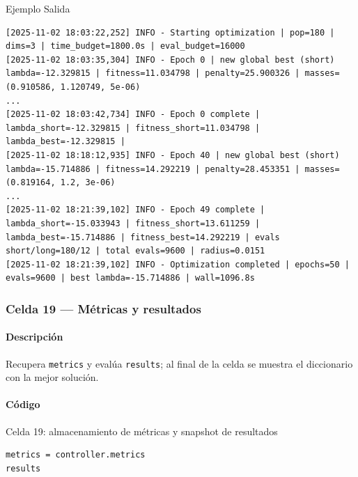 \begin{listing}[H]
\caption{Ejemplo Salida}
\begin{adjustbox}{max width=0.7\textwidth}
\begin{minipage}{\textwidth}
\begin{verbatim}
[2025-11-02 18:03:22,252] INFO - Starting optimization | pop=180 | dims=3 | time_budget=1800.0s | eval_budget=16000
[2025-11-02 18:03:35,304] INFO - Epoch 0 | new global best (short) lambda=-12.329815 | fitness=11.034798 | penalty=25.900326 | masses=(0.910586, 1.120749, 5e-06)
...
[2025-11-02 18:03:42,734] INFO - Epoch 0 complete | lambda_short=-12.329815 | fitness_short=11.034798 | lambda_best=-12.329815 |
[2025-11-02 18:18:12,935] INFO - Epoch 40 | new global best (short) lambda=-15.714886 | fitness=14.292219 | penalty=28.453351 | masses=(0.819164, 1.2, 3e-06)
...
[2025-11-02 18:21:39,102] INFO - Epoch 49 complete | lambda_short=-15.033943 | fitness_short=13.611259 | lambda_best=-15.714886 | fitness_best=14.292219 | evals short/long=180/12 | total evals=9600 | radius=0.0151
[2025-11-02 18:21:39,102] INFO - Optimization completed | epochs=50 | evals=9600 | best lambda=-15.714886 | wall=1096.8s
\end{verbatim}
\end{minipage}
\end{adjustbox}
\end{listing}

\subsubsection*{Celda 19 — Métricas y resultados}
\paragraph{Descripción} Recupera \texttt{metrics} y evalúa \texttt{results}; al final de la celda se muestra el diccionario con la mejor solución.
\paragraph{Código}
\begin{listing}[H]
\caption{Celda 19: almacenamiento de métricas y snapshot de resultados}
\begin{adjustbox}{max width=\textwidth}
\begin{minipage}{\textwidth}
\begin{verbatim}
metrics = controller.metrics
results
\end{verbatim}
\end{minipage}
\end{adjustbox}
\end{listing}
